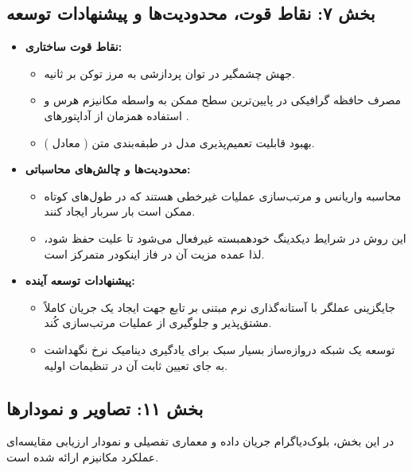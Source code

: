 \subsection*{بخش ۷: نقاط قوت، محدودیت‌ها و پیشنهادات توسعه }
\begin{itemize}
    \item \textbf{نقاط قوت ساختاری:}
    \begin{itemize}
        \item جهش چشمگیر در توان پردازشی به مرز  توکن بر ثانیه.
        \item مصرف حافظه گرافیکی در پایین‌ترین سطح ممکن  به واسطه مکانیزم هرس و استفاده همزمان از آداپتورهای .
        \item بهبود قابلیت تعمیم‌پذیری مدل در طبقه‌بندی متن ( معادل ).
    \end{itemize}
    \item \textbf{محدودیت‌ها و چالش‌های محاسباتی:}
    \begin{itemize}
        \item محاسبه واریانس و مرتب‌سازی  عملیات غیرخطی هستند که در طول‌های کوتاه ممکن است بار سربار ایجاد کنند.
        \item این روش در شرایط دیکدینگ خودهمبسته  غیرفعال می‌شود تا علیت حفظ شود، لذا عمده مزیت آن در فاز اینکودر متمرکز است.
    \end{itemize}
    \item \textbf{پیشنهادات توسعه آینده:}
    \begin{itemize}
        \item جایگزینی عملگر  با آستانه‌گذاری نرم  مبتنی بر تابع  جهت ایجاد یک جریان کاملاً مشتق‌پذیر و جلوگیری از عملیات مرتب‌سازی کُند.
        \item توسعه یک شبکه دروازه‌ساز  بسیار سبک برای یادگیری دینامیک نرخ نگهداشت  به جای تعیین ثابت آن در تنظیمات اولیه.
    \end{itemize}
\end{itemize}

\subsection*{بخش ۱۱: تصاویر و نمودارها }
در این بخش، بلوک‌دیاگرام جریان داده و معماری تفصیلی و نمودار ارزیابی مقایسه‌ای عملکرد مکانیزم  ارائه شده است.

